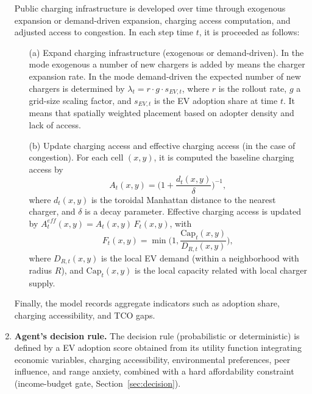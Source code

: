 \documentclass[11pt]{article}
\begin{document}
\begin{enumerate}
  Public charging infrastructure is developed over time through exogenous
  expansion or demand-driven expansion, charging access computation, and
  adjusted access to congestion. In each step time $t$, it is proceeded as
  follows:
  \begin{enumerate}
  \item[(a)] Expand charging infrastructure (exogenous or demand-driven). In
    the mode exogenous a number of new chargers is added by means the
    charger expansion rate. In the mode demand-driven the expected number of
    new chargers is determined by $\lambda_t = r\cdot g\cdot s_{EV,t}$,
    where $r$ is the rollout rate, $g$ a grid-size scaling factor, and
    $s_{EV,t}$ is the EV adoption share at time $t$. It means that spatially
    weighted placement based on adopter density and lack of access.
  \item[(b)] Update charging access and effective charging access (in the
    case of congestion). For each cell $(x,y)$, it is computed the baseline
    charging access by
    \begin{equation}
      A_t(x,y) = \Big(1+\frac{d_t(x,y)}{\delta}\Big)^{-1},
    \end{equation}
    where $d_t(x,y)$ is the toroidal Manhattan distance to the nearest
    charger, and $\delta$ is a decay parameter. Effective charging access
    is updated by $A^{e\!f\!f}_t(x,y) = A_t(x,y)\, F_t(x,y)$, with
    \begin{equation}
      F_t(x,y) = \min\Big(1, \frac{\mathrm{Cap}_t(x,y)}{D_{R,t}(x,y)}\Big),
    \end{equation}
    where $D_{R,t}(x,y)$ is the local EV demand (within a neighborhood with
    radius $R$), and $\mathrm{Cap}_t(x,y)$ is the local capacity related
    with local charger supply.
  \end{enumerate}

  Finally, the model records aggregate indicators such as adoption share,
  charging accessibility, and TCO gaps.

\item \textbf{Agent's decision rule.} The decision rule (probabilistic or
  deterministic) is defined by a EV adoption score obtained from its utility
  function integrating economic variables, charging accessibility,
  environmental preferences, peer influence, and range anxiety, combined
  with a hard affordability constraint (income-budget gate,
  Section~\ref{sec:decision}).


\end{enumerate}
\end{document}
